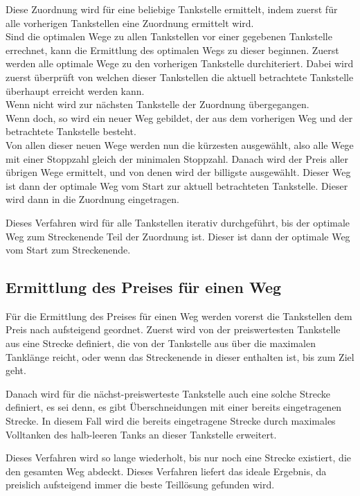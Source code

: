 \documentclass[a4paper,10pt,ngerman]{scrartcl}
\begin{document}
Diese Zuordnung wird für eine beliebige Tankstelle ermittelt, indem zuerst für alle vorherigen Tankstellen eine Zuordnung ermittelt wird. \\
Sind die optimalen Wege zu allen Tankstellen vor einer gegebenen Tankstelle errechnet, kann die Ermittlung des optimalen Wegs zu dieser beginnen.
Zuerst werden alle optimale Wege zu den vorherigen Tankstelle durchiteriert. Dabei wird zuerst überprüft von welchen dieser Tankstellen die aktuell betrachtete Tankstelle überhaupt erreicht werden kann. \\
Wenn nicht wird zur nächsten Tankstelle der Zuordnung übergegangen. \\
Wenn doch, so wird ein neuer Weg gebildet, der aus dem vorherigen Weg und der betrachtete Tankstelle besteht. \\
Von allen dieser neuen Wege werden nun die kürzesten ausgewählt, also alle Wege mit einer Stoppzahl gleich der minimalen Stoppzahl. Danach wird der Preis aller übrigen Wege ermittelt, und von denen wird der billigste ausgewählt. Dieser Weg ist dann der optimale Weg vom Start zur aktuell betrachteten Tankstelle. Dieser wird dann in die Zuordnung eingetragen.

Dieses Verfahren wird für alle Tankstellen iterativ durchgeführt, bis der optimale Weg zum Streckenende Teil der Zuordnung ist. Dieser ist dann der optimale Weg vom Start zum Streckenende.

\subsection{Ermittlung des Preises für einen Weg}

Für die Ermittlung des Preises für einen Weg werden vorerst die Tankstellen dem Preis nach aufsteigend geordnet. Zuerst wird von der preiswertesten Tankstelle aus eine Strecke definiert, die von der Tankstelle aus über die maximalen Tanklänge reicht, oder wenn das Streckenende in dieser enthalten ist, bis zum Ziel geht.

Danach wird für die nächst-preiswerteste Tankstelle auch eine solche Strecke definiert, es sei denn, es gibt Überschneidungen mit einer bereits eingetragenen Strecke. In diesem Fall wird die bereits eingetragene Strecke durch maximales Volltanken des halb-leeren Tanks an dieser Tankstelle erweitert.

Dieses Verfahren wird so lange wiederholt, bis nur noch eine Strecke existiert, die den gesamten Weg abdeckt. Dieses Verfahren liefert das ideale Ergebnis, da preislich aufsteigend immer die beste Teillösung gefunden wird. 
\end{document}
